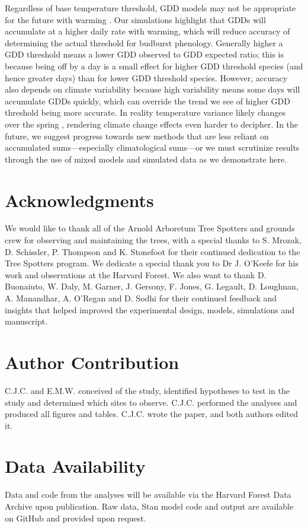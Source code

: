 \documentclass{article}\usepackage[]{graphicx}\usepackage[]{color}
\begin{document}
Regardless of base temperature threshold, GDD models may not be appropriate for the future with warming \citep{Man2010}. Our simulations highlight that GDDs will accumulate at a higher daily rate with warming, which will reduce accuracy of determining the actual threshold for budburst phenology. Generally higher a GDD threshold means a lower GDD observed to GDD expected ratio; this is because being off by a day is a small effect for higher GDD threshold species (and hence greater days) than for lower GDD threshold species. However, accuracy also depends on climate variability because high variability means some days will accumulate GDDs quickly, which can override the trend we see of higher GDD threshold being more accurate. In reality temperature variance likely changes over the spring \citep{Qu2014}, rendering climate change effects even harder to decipher. In the future, we suggest progress towards new methods that are less reliant on accumulated sums---especially climatological sums---or we must scrutinize results through the use of mixed models and simulated data as we demonstrate here.

\section*{Acknowledgments}
We would like to thank all of the Arnold Arboretum Tree Spotters and grounds crew for observing and maintaining the trees, with a special thanks to S. Mrozak, D. Schissler, P. Thompson and K. Stonefoot for their continued dedication to the Tree Spotters program. We dedicate a special thank you to Dr J. O'Keefe for his work and observations at the Harvard Forest. We also want to thank D. Buonaiuto, W. Daly, M. Garner, J. Gersony, F. Jones, G. Legault, D. Loughnan, A. Manandhar, A. O'Regan and D. Sodhi for their continued feedback and insights that helped improved the experimental design, models, simulations and manuscript. 

\section*{Author Contribution} 
C.J.C. and E.M.W. conceived of the study, identified hypotheses to test in the study and determined which sites to observe. C.J.C. performed the analyses and produced all figures and tables. C.J.C. wrote the paper, and both authors edited it.

\section*{Data Availability}
Data and code from the analyses will be available via the Harvard Forest Data Archive upon publication. Raw data, {Stan} model code and output are available on GitHub and provided upon request.
\end{document}

